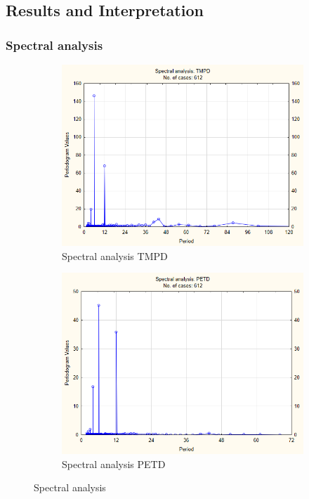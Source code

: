 \documentclass[12pt,a4paper]{article}
\begin{document}
\subsection{Results and Interpretation}
\subsubsection{Spectral analysis}
\begin{figure}[h]
	\centering
\begin{subfigure}[b]{0.45\textwidth}
	\centering
	\includegraphics[width=\linewidth]{"Spectral analysis TMPD"}
	\caption{Spectral analysis TMPD}
	\label{fig:spectral-analysis-tmpd}
\end{subfigure}
\begin{subfigure}[b]{0.45\textwidth}
	\centering
	\includegraphics[width=\linewidth]{"Spectral analysis PETD"}
	\caption{Spectral analysis PETD}
	\label{fig:spectral-analysis-petd}
\end{subfigure}
\caption{Spectral analysis}\label{fig:trapez1}
\end{figure}
\end{document}
